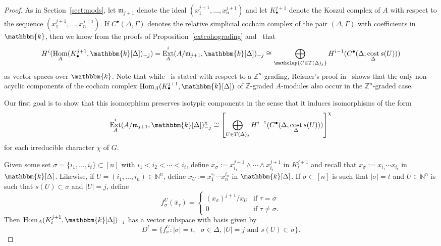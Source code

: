 \documentclass[ALCO,ThmDefs,Unicode]{cedram}
\DeclareMathOperator\cost{cost}
\DeclareMathOperator{\Hom}{Hom}
\DeclareMathOperator{\Ext}{Ext}
\newcommand{\field}{\mathbbm{k}}
\newcommand{\NN}{{\mathbb N}}
\newcommand{\ZZ}{{\mathbb Z}}
\newcommand{\mideal}{\ensuremath{\mathfrak{m}}}
\begin{document}
\begin{proof}
As in Section~\ref{sect:mods}, let $\mideal_{j+1}$ denote the ideal $(x_1^{j+1}, \ldots, x_n^{j+1})$ and let $K_\bullet^{j+1}$ denote the Koszul complex of $A$ with respect to the sequence $(x_1^{j+1}, \ldots, x_n^{j+1})$. If $C^\bullet(\Delta, \Gamma)$ denotes the relative simplicial cochain complex of the pair $(\Delta, \Gamma)$ with coefficients in $\field$, then we know from the proofs of Proposition~\ref{extcohograding} and~\cite[Theorem~1]{characterizations} that
\begin{align}\label{ExtAndCochainComplex}
H^i(\Hom_A(K_\bullet^{j+1}, \field[\Delta])_{-j})=\Ext_{A}^i(A/\mideal_{j+1}, \field[\Delta])_{-j}\cong \bigoplus_{\mathclap{{U\in T(\Delta)_j}}}H^{i-1}(C^\bullet(\Delta, \cost_\Delta s(U)))
\end{align}
as vector spaces over $\field$. Note that while~\cite[Theorem~1]{characterizations} is stated with respect to a $\ZZ^n$-grading, Reisner's proof in~\cite[Theorem~2]{Reisner} shows that the only non-acyclic components of the cochain complex $\Hom_A(K_\bullet^{j+1}, \field[\Delta])$ of $\ZZ$-graded $A$-modules also occur in the $\ZZ^n$-graded case.

Our first goal is to show that this isomorphism preserves isotypic components in the sense that it induces isomorphisms of the form
\begin{equation}\label{extiso}
\Ext_{A}^i(A/\mideal_{j+1}, \field[\Delta])_{-j}^\chi\cong \left[\bigoplus_{U\in T(\Delta)_j}H^{i-1}(C^\bullet(\Delta, \cost_\Delta s(U)))\right]^{\chi}
\end{equation}
for each irreducible character $\chi$ of $G$.



Given some set $\sigma=\{i_1, \ldots, i_t\}\subset [n]$ with $i_1<i_2<\cdots<i_t$, define $\overline{x}_\sigma:=x_{i_1}^{j+1}\wedge\cdots\wedge x_{i_t}^{j+1}$ in $K_t^{j+1}$ and recall that $x_\sigma := x_{i_1}\cdots x_{i_t}$ in $\field[\Delta]$. Likewise, if $U=(i_1, \ldots, i_n)\in \NN^n$, define $x_U:=x_{1}^{i_1}\cdots x_{n}^{i_n}$ in $\field[\Delta]$. If $\sigma\subset [n]$ is such that $|\sigma|=t$ and $U\in \NN^n$ is such that $s(U)\subset \sigma$ and $|U|=j$, define
\[
f_{\sigma}^U(\overline{x}_\tau)=
\begin{cases}
(x_\sigma)^{j+1}/x_U & \text{if } \tau=\sigma\\
0 & \text{if }\tau\not=\sigma.
\end{cases}
\]
Then $\Hom_A(K_t^{j+1}, \field[\Delta])_{-j}$ has a vector subspace with basis given by
\[
D^t=\{f_{\sigma}^U: |\sigma|=t, \text{ $\sigma\in \Delta$, $|U|=j$ and }s(U)\subset \sigma \}.
\]


\end{proof}
\end{document}

